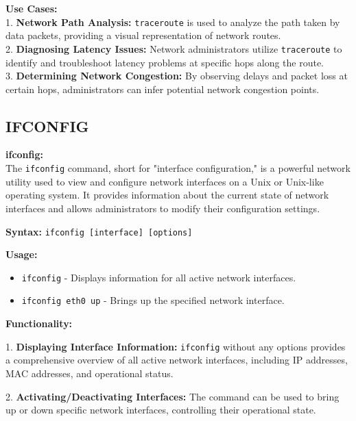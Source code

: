 \documentclass[11pt]{report}
\begin{document}
\vspace{\baselineskip}

\textbf{Use Cases:}\\
1. \textbf{Network Path Analysis:} \texttt{traceroute} is used to analyze the path taken by data packets, providing a visual representation of network routes.\\
2. \textbf{Diagnosing Latency Issues:} Network administrators utilize \texttt{traceroute} to identify and troubleshoot latency problems at specific hops along the route.\\
3. \textbf{Determining Network Congestion:} By observing delays and packet loss at certain hops, administrators can infer potential network congestion points.


\subsection{IFCONFIG}
\textbf{ifconfig:} \\
The \texttt{ifconfig} command, short for "interface configuration," is a powerful network utility used to view and configure network interfaces on a Unix or Unix-like operating system. It provides information about the current state of network interfaces and allows administrators to modify their configuration settings.

\vspace{\baselineskip}

\textbf{Syntax:}
\texttt{ifconfig [interface] [options]}

\vspace{\baselineskip}

\textbf{Usage:}
\begin{itemize}
    \item \texttt{ifconfig} - Displays information for all active network interfaces.
    \item \texttt{ifconfig eth0 up} - Brings up the specified network interface.
\end{itemize}

\vspace{\baselineskip}

\textbf{Functionality:}

1. \textbf{Displaying Interface Information:} \texttt{ifconfig} without any options provides a comprehensive overview of all active network interfaces, including IP addresses, MAC addresses, and operational status.

2. \textbf{Activating/Deactivating Interfaces:} The command can be used to bring up or down specific network interfaces, controlling their operational state.
\end{document}
